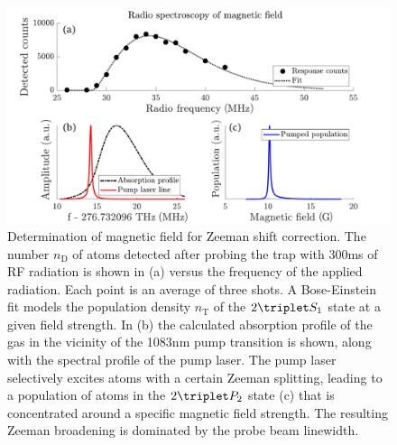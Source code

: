 	\begin{figure}
	\centering
  \includegraphics[width=\textwidth]{fig/spectroscopy/rf_spec_subfig-eps-converted-to.pdf}
  \caption{Determination of magnetic field for Zeeman shift correction.
	The number $n_\text{D}$ of atoms detected after probing the trap with 300ms of RF radiation is shown in (a) versus the frequency of the applied radiation.
	Each point is an average of three shots.
	A Bose-Einstein fit models the population density $n_\text{T}$ of the $2\triplet S_1$ state at a given field strength.
	In (b) the calculated absorption profile of the gas in the vicinity of the 1083nm pump transition is shown, along with the spectral profile of the pump laser.
	The pump laser selectively excites atoms with a certain Zeeman splitting, leading to a population of atoms in the $2\triplet P_2$ state (c) that is concentrated around a specific magnetic field strength.
	The resulting Zeeman broadening is dominated by the probe beam linewidth.}
  \label{fig:RF_spec}
\end{figure}



